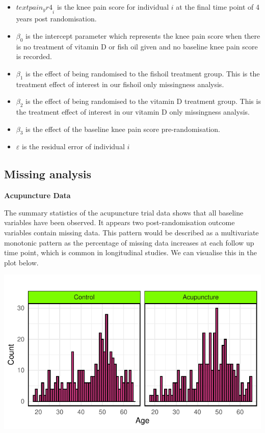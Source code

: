 \documentclass{article}
\providecommand{\tightlist}{%
  \setlength{\itemsep}{0pt}\setlength{\parskip}{0pt}}
\begin{document}
\begin{itemize}
\tightlist
\item
  \(text{pain_yr4}_i\) is the knee pain score for individual \(i\) at
  the final time point of 4 years post randomisation.
\item
  \(\beta_0\) is the intercept parameter which represents the knee pain
  score when there is no treatment of vitamin D or fish oil given and no
  baseline knee pain score is recorded.
\item
  \(\beta_1\) is the effect of being randomised to the fishoil treatment
  group. This is the treatment effect of interest in our fishoil only
  missingness analysis.
\item
  \(\beta_2\) is the effect of being randomised to the vitamin D
  treatment group. This is the treatment effect of interest in our
  vitamin D only missingness analysis.
\item
  \(\beta_3\) is the effect of the baseline knee pain score
  pre-randomisation.
\item
  \(\varepsilon\) is the residual error of individual \(i\)
\end{itemize}

\subsection{Missing analysis}\label{missing-analysis}

\textbf{Acupuncture Data}

The summary statistics of the acupuncture trial data shows that all
baseline variables have been observed. It appears two post-randomisation
outcome variables contain missing data. This pattern would be described
as a multivariate monotonic pattern as the percentage of missing data
increases at each follow up time point, which is common in longitudinal
studies. We can visualise this in the plot below.

\includegraphics{Final_Report_files/figure-latex/unnamed-chunk-8-1.pdf}
\end{document}
